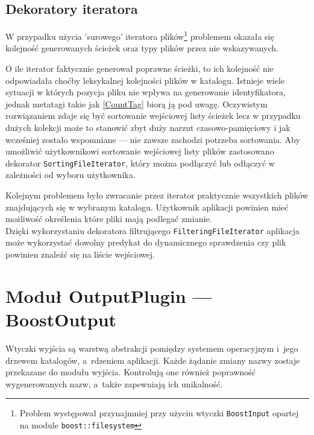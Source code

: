 \subsection{Dekoratory iteratora}
\par
W przypadku użycia 'surowego' iteratora plików\footnote{Problem występował przynajmniej przy użyciu wtyczki \texttt{BoostInput} opartej na module \texttt{boost::filesystem}} problemem okazała się kolejność generowanych ścieżek oraz typy plików przez nie wskazywanych.
\par
O ile iterator faktycznie generował poprawne ścieżki, to ich kolejność nie odpowiadała choćby leksykalnej kolejności plików w katalogu. Istnieje wiele sytuacji w których pozycja pliku nie wpływa na generowanie identyfikatora, jednak metatagi takie jak \ref{CountTag} biorą ją pod uwagę. Oczywistym rozwiązaniem zdaje się być sortowanie wejściowej listy ścieżek lecz w przypadku dużych kolekcji może to stanowić zbyt duży narzut czasowo-pamięciowy i jak wcześniej zostało wspomniane --- nie zawsze zachodzi potrzeba sortowania. Aby umożliwić użytkownikowi sortowanie wejściowej listy plików zastosowano dekorator \texttt{SortingFileIterator}, który można podłączyć lub odłączyć w zależności od wyboru użytkownika.

\par
Kolejnym problemem było zwracanie przez iterator praktycznie wszystkich plików znajdujących się w wybranym katalogu. Użytkownik aplikacji powinien mieć możliwość określenia które pliki mają podlegać zmianie.\\
Dzięki wykorzystaniu dekoratora filtrującego \texttt{FilteringFileIterator} aplikacja może wykorzystać dowolny predykat do dynamicznego sprawdzenia czy plik powinien znaleźć się na liście wejściowej.

\section{Moduł OutputPlugin --- BoostOutput}
\par
Wtyczki wyjścia są warstwą abstrakcji pomiędzy systemem operacyjnym i~jego drzewem katalogów, a~rdzeniem aplikacji.
Każde żądanie zmiany nazwy zostaje przekazane do modułu wyjścia.
Kontrolują one również poprawność wygenerowanych nazw, a~także zapewniają ich unikalność.

